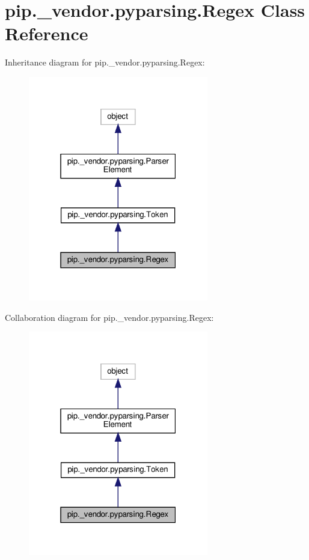 \hypertarget{classpip_1_1__vendor_1_1pyparsing_1_1Regex}{}\section{pip.\+\_\+vendor.\+pyparsing.\+Regex Class Reference}
\label{classpip_1_1__vendor_1_1pyparsing_1_1Regex}


Inheritance diagram for pip.\+\_\+vendor.\+pyparsing.\+Regex\+:
\nopagebreak
\begin{figure}[H]
\begin{center}
\leavevmode
\includegraphics[width=223pt]{classpip_1_1__vendor_1_1pyparsing_1_1Regex__inherit__graph}
\end{center}
\end{figure}


Collaboration diagram for pip.\+\_\+vendor.\+pyparsing.\+Regex\+:
\nopagebreak
\begin{figure}[H]
\begin{center}
\leavevmode
\includegraphics[width=223pt]{classpip_1_1__vendor_1_1pyparsing_1_1Regex__coll__graph}
\end{center}
\end{figure}
